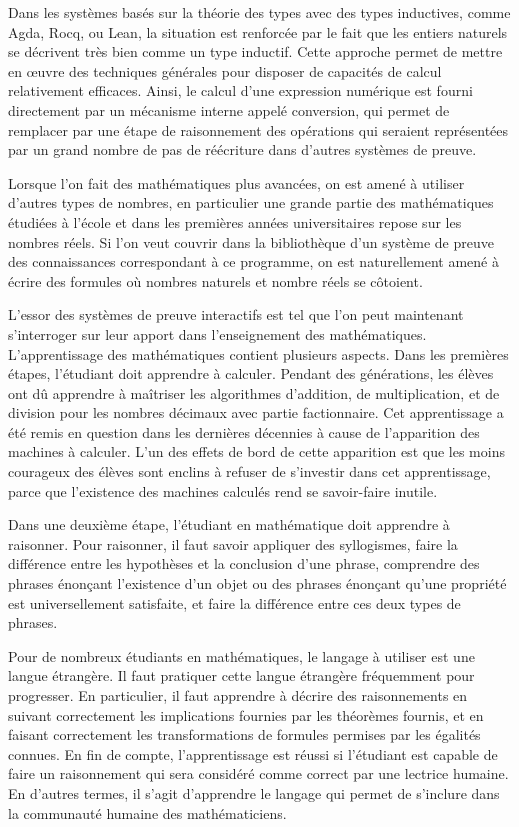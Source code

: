 \documentclass[draft]{jflart}
\begin{document}
Dans les systèmes basés sur la théorie des types avec des types
inductives, comme Agda, Rocq, ou Lean, la situation est renforcée par
le fait que les entiers naturels se décrivent très bien comme un type
inductif.  Cette approche permet de mettre en œuvre des techniques
générales pour disposer de capacités de calcul relativement efficaces.
Ainsi, le calcul d'une expression numérique est fourni directement par
un mécanisme interne appelé conversion, qui permet de remplacer par
une étape de raisonnement des opérations qui seraient représentées par
un grand nombre de pas de réécriture dans d'autres systèmes de preuve.

Lorsque l'on fait des mathématiques plus avancées, on est amené à
utiliser d'autres types de nombres, en particulier une grande partie
des mathématiques étudiées à l'école et dans les premières années
universitaires repose sur les nombres réels.  Si l'on veut couvrir
dans la bibliothèque d'un système de preuve des connaissances
correspondant à ce programme, on est naturellement amené à écrire des
formules où nombres naturels et nombre réels se côtoient.

L'essor des systèmes de preuve interactifs est tel que l'on peut
maintenant s'interroger sur leur apport dans l'enseignement des
mathématiques.  L'apprentissage des mathématiques contient plusieurs
aspects.  Dans les premières étapes, l'étudiant doit apprendre à
calculer.  Pendant des générations, les élèves ont dû apprendre à
maîtriser les algorithmes d'addition, de multiplication, et de
division pour les nombres décimaux avec partie factionnaire.  Cet
apprentissage a été remis en question dans les dernières décennies à
cause de l'apparition des machines à calculer.  L'un des effets de
bord de cette apparition est que les moins courageux des élèves sont
enclins à refuser de s'investir dans cet apprentissage, parce que
l'existence des machines calculés rend se savoir-faire inutile.

Dans une deuxième étape, l'étudiant en mathématique doit apprendre à
raisonner.  Pour raisonner, il faut savoir appliquer des
syllogismes, faire la différence entre les hypothèses et la conclusion
d'une phrase, comprendre des phrases énonçant l'existence d'un objet
ou des phrases énonçant qu'une propriété est universellement
satisfaite, et faire la différence entre ces deux types de phrases.

Pour de nombreux étudiants en mathématiques, le langage à utiliser est
une langue étrangère.  Il faut pratiquer cette langue étrangère
fréquemment pour progresser.  En particulier, il faut apprendre à décrire
des raisonnements en suivant correctement les implications fournies par
les théorèmes fournis, et en faisant correctement les transformations
de formules permises par les égalités connues.  En fin de compte,
l'apprentissage est réussi si l'étudiant est capable de faire un
raisonnement qui sera considéré comme correct par une lectrice humaine.
En d'autres termes, il s'agit d'apprendre le langage qui permet de
s'inclure dans la communauté humaine des mathématiciens.
\end{document}
